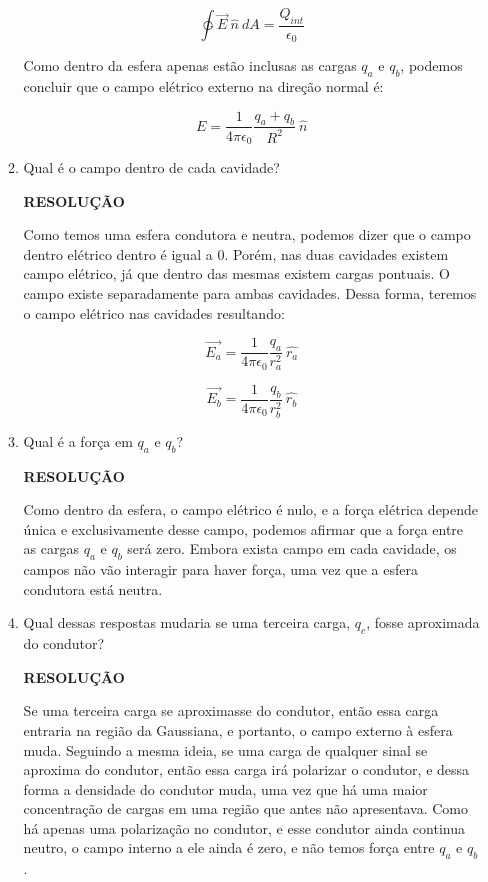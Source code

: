 \documentclass[11pt,a4paper]{article}
\begin{document}
\begin{enumerate}
\begin{enumerate}
$$\displaystyle\ointctrclockwise \vec{E} \ \hat{n} \ dA =  \displaystyle\dfrac{Q_{int}}{\epsilon_0}$$

Como dentro da esfera apenas estão inclusas as cargas $q_a$ e $q_b$, podemos concluir que o campo elétrico externo na direção normal é: 

$$E = \displaystyle\dfrac{1}{4\pi \epsilon_0}\displaystyle\dfrac{q_a + q_b}{R^2} \ \hat{n}$$


\item Qual é o campo dentro de cada cavidade?


\textbf{RESOLUÇÃO}

Como temos uma esfera condutora e neutra, podemos dizer que o campo dentro elétrico dentro é igual a $0$. Porém, nas duas cavidades existem campo elétrico, já que dentro das mesmas existem cargas pontuais. O campo existe separadamente para ambas cavidades. Dessa forma, teremos o campo elétrico nas cavidades resultando:

$$\vec{E_a} = \displaystyle\dfrac{1}{4\pi \epsilon_0}\displaystyle\dfrac{q_a}{r_a^2} \ \hat{r_a}$$

$$\vec{E_b} = \displaystyle\dfrac{1}{4\pi \epsilon_0}\displaystyle\dfrac{q_b}{r_b^2} \ \hat{r_b}$$

\item Qual é a força em $q_a$ e $q_b$?


\textbf{RESOLUÇÃO}

Como dentro da esfera, o campo elétrico é nulo, e a força elétrica depende única e exclusivamente desse campo, podemos afirmar que a força entre as cargas $q_a$ e $q_b$ será zero. Embora exista campo em cada cavidade, os campos não vão interagir para haver força, uma vez que a esfera condutora está neutra.

\item Qual dessas respostas mudaria se uma terceira carga, $q_c$, fosse aproximada do condutor?

\textbf{RESOLUÇÃO}


Se uma terceira carga se aproximasse do condutor, então essa carga entraria na região da Gaussiana, e portanto, o campo externo à esfera muda. Seguindo a mesma ideia, se uma carga de qualquer sinal se aproxima do condutor, então essa carga irá polarizar o condutor, e dessa forma a densidade do condutor muda, uma vez que há uma maior concentração de cargas em uma região que antes não apresentava. Como há apenas uma polarização no condutor, e esse condutor ainda continua neutro, o campo interno a ele ainda é zero, e não temos força entre $q_a$ e $q_b$.
\end{enumerate}



\end{enumerate}
\end{document}
